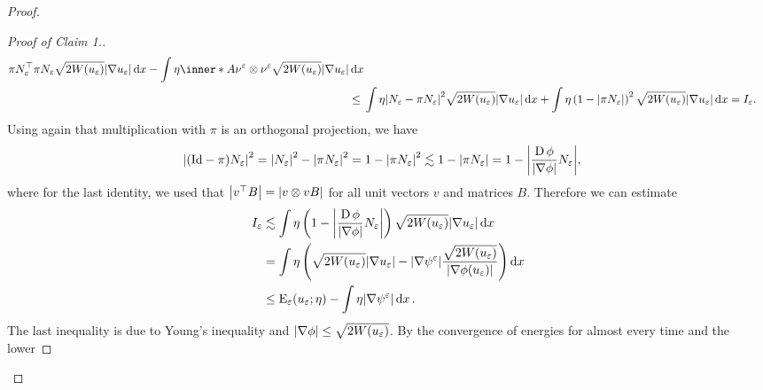 \begin{proof}
\begin{proof}[Proof of Claim 1.]
\begin{align*}
{					{ \pi N_{ \varepsilon }^{ \top } \pi N_{ \varepsilon } }
					\sqrt{ 2 W ( u_{ \varepsilon } ) } \abs{ \nabla u_{ 
					\varepsilon } }
				\dd{ x }
				-
				\int
					\eta
					\inner*{ A }
					{ \nu^{ \varepsilon } \otimes \nu^{ \varepsilon } }
					\sqrt{ 2 W ( u_{ \varepsilon } ) }
					\abs{ \nabla u_{ \varepsilon } }
				\dd{ x }
			}
			\\
			\leq{} & 
			\int
				\eta
				\abs{ N_{ \varepsilon } - \pi N_{ \varepsilon } }^{ 2 }
				\sqrt{ 2 W ( u_{ \varepsilon} ) } \abs{ \nabla u_{ \varepsilon 
				} }
			\dd{ x }
			+
			\int
				\eta
				\left( 
					1 - \abs{ \pi N_{ \varepsilon } }
				\right)^{ 2 }
				\sqrt{ 2 W ( u_{ \varepsilon } ) } \abs{ \nabla u_{ \varepsilon 
				} }
			\dd{ x }= I_{ \varepsilon }.
		\end{align*}
		Using again that multiplication with $ \pi $ is an orthogonal 
		projection, we have
		\begin{align*}
			\abs{
				( \mathrm{Id} - \pi ) N_{ \varepsilon }
			}^{ 2 }
			& =
			\abs{ N_{ \varepsilon } }^{ 2 } 
			-
			\abs{ \pi N_{ \varepsilon } }^{ 2 }
			=
			1 - \abs{ \pi N_{ \varepsilon } }^{ 2 }
			\lesssim
			1 - \abs{ \pi N_{ \varepsilon } }
			=
			1 -
			\abs{ \frac{ \operatorname{D} \phi }{ \abs{ \nabla \phi } } N_{ \varepsilon } 
			},
		\end{align*}
		where for the last identity, we used that $ \abs{ v^{ \top } B } = 
		\abs{ v \otimes v B } $ for all unit vectors $ v $ and matrices $ B $.
		Therefore we can estimate
		\begin{align*}
			I_{ \varepsilon }
			& \lesssim
			\int
				\eta
				\left(
					1 - \abs{ \frac{ \operatorname{D} \phi }{ \abs{ \nabla \phi } } N_{ 
					\varepsilon } }
				\right)
				\sqrt{ 2 W ( u_{ \varepsilon } ) }
				\abs{ \nabla u_{ \varepsilon } }
			\dd{ x }
			\\
			& =
			\int
				\eta 
				\left(
					\sqrt{ 2 W ( u_{ \varepsilon } ) }
					\abs{ \nabla u_{ \varepsilon } }
					-
					\abs{ \nabla \psi^{ \varepsilon } }
					\frac{ \sqrt{ 2 W ( u_{ \varepsilon } ) } }{ \abs{ \nabla 
					\phi ( u_{ \varepsilon } ) } }
				\right)
			\dd{ x }
			\\
			& \leq
			\operatorname{E}_{ \varepsilon } ( u_{ \varepsilon } ; \eta )
			-
			\int
				\eta
				\abs{ \nabla \psi^{ \varepsilon } }
			\dd{ x }.
		\end{align*}
		The last inequality is due to Young's inequality and $ \abs{ \nabla 
		\phi } \leq \sqrt{ 2 W ( u_{ \varepsilon } ) } $.
		By the convergence of energies for almost every time and the lower 

\end{proof}
\end{proof}

